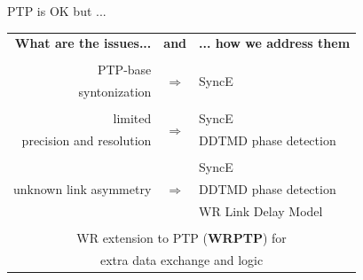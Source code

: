 \documentclass[compress,red]{beamer}
\begin{document}
\begin{frame}{PTP is OK but ...}

  \resizebox{11cm}{!} 
  {
    \begin{tabular}{ r c l }
  {\bf What are the issues...} 	& {\bf and}      & {\bf ... how we address them}  \\
				&     		 &        \\
      PTP-base		 	& \multirow{2}{*}{$\Rightarrow$}  & \multirow{2}{*}{SyncE }\\
      syntonization	        &      		 &        \\
				&      		 &        			\\
      limited             	&\multirow{2}{*}{$\Rightarrow$}  	 & SyncE \\
      precision and resolution  &      		 & DDTMD phase detection\\
				&    		 &        \\
			        &      		 & SyncE  \\
      unknown link asymmetry    & $\Rightarrow$  & DDTMD phase detection \\
				&      		 & WR Link Delay Model \\
				&      		 &        \\
      \multicolumn{3}{c}{WR extension to PTP ({\bf WRPTP}) for } \\
      \multicolumn{3}{c}{extra data exchange and logic} \\
    \end{tabular}
  }
\end{frame}
% 
% 
% 
% 
% 
\end{document}
